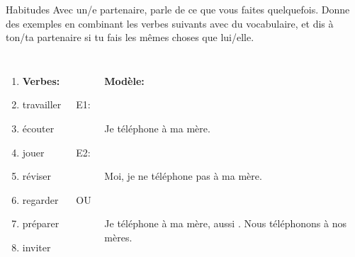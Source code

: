 \begin{frame}{Habitudes }
  Avec un/e partenaire, parle de ce que vous faites quelquefois.
  Donne des exemples en combinant les verbes suivants avec du vocabulaire, et dis à ton/ta partenaire si tu fais les mêmes choses que lui/elle. \\
  \begin{columns}[t]
      \begin{enumerate}
        \item[] \textbf{Verbes:}
        \item travailler
        \item écouter
        \item jouer
        \item réviser
        \item regarder
        \item préparer
        \item inviter
      \end{enumerate}
      \begin{description}
        \item[] \textbf{Modèle:}
        \item[E1:] Je téléphone à ma mère.
        \item[] 
        \item[E2:] Moi, je ne téléphone pas à ma mère.
        \item[] 
        \item[OU] Je téléphone à ma mère, aussi . Nous téléphonons à nos mères.
        \item[] 
      \end{description}
  \end{columns}
\end{frame}